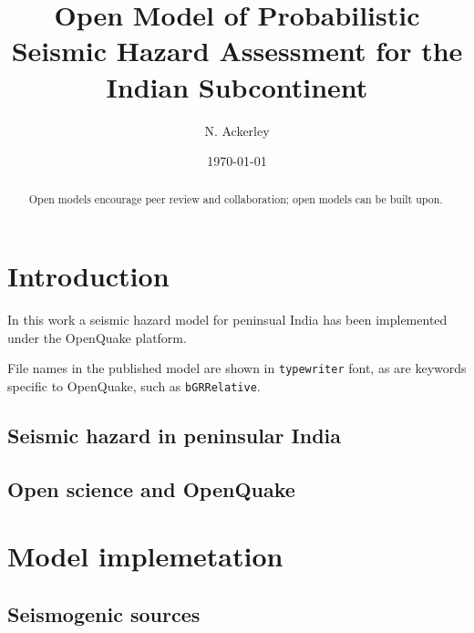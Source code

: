 \documentclass{article}
\begin{document}
\title{Open Model of Probabilistic Seismic Hazard Assessment for the Indian Subcontinent}
\date{\today}

\setcounter{Maxaffil}{0} %
\author[1,2]{N. Ackerley}

\maketitle

\begin{abstract}
Open models encourage peer review and collaboration; open models can be built upon.
\end{abstract}

\tableofcontents
\listoffigures
\listoftables

\section{Introduction}
\label{sec:Introduction}

In this work a seismic hazard model for peninsual India \cite{nath2012probabilistic} has been implemented under the OpenQuake \citep{weatherill2014openquake,crowley2015openquake} platform.

File names in the published model are shown in \texttt{typewriter} font, as are keywords specific to OpenQuake, such as \texttt{bGRRelative}.

\subsection{Seismic hazard in peninsular India}
\label{sec:PshaIndia}

\subsection{Open science and OpenQuake}
\label{sec:Open}

\section{Model implemetation}
\label{sec:Model}

\subsection{Seismogenic sources}
\label{sec:Sources}
\end{document}
